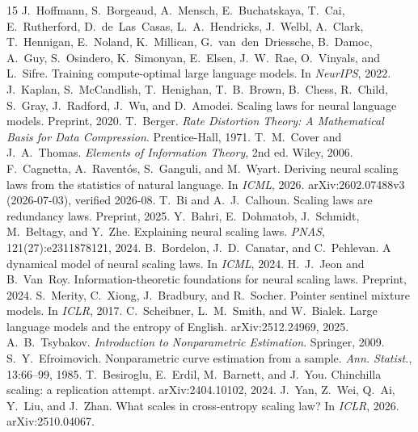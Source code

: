 \documentclass[12pt]{article}
\theoremstyle{remark}
\begin{document}


\begin{thebibliography}{15}
 J.~Hoffmann, S.~Borgeaud, A.~Mensch, E.~Buchatskaya, T.~Cai, E.~Rutherford,
D.~de~Las~Casas, L.~A.~Hendricks, J.~Welbl, A.~Clark, T.~Hennigan,
E.~Noland, K.~Millican, G.~van~den~Driessche, B.~Damoc, A.~Guy,
S.~Osindero, K.~Simonyan, E.~Elsen, J.~W.~Rae, O.~Vinyals, and
L.~Sifre.
Training compute-optimal large language models.
In \textit{NeurIPS}, 2022.
 J.~Kaplan, S.~McCandlish, T.~Henighan, T.~B.~Brown, B.~Chess,
R.~Child, S.~Gray, J.~Radford, J.~Wu, and D.~Amodei.
Scaling laws for neural language models.
Preprint, 2020.
 T.~Berger.
\textit{Rate Distortion Theory: A Mathematical Basis for Data Compression}.
Prentice-Hall, 1971.
 T.~M.~Cover and J.~A.~Thomas.
\textit{Elements of Information Theory}, 2nd ed.
Wiley, 2006.
 F.~Cagnetta, A.~Ravent\'os, S.~Ganguli, and M.~Wyart.
Deriving neural scaling laws from the statistics of natural language.
In \textit{ICML}, 2026. arXiv:2602.07488v3 (2026-07-03), verified 2026-08.
 T.~Bi and A.~J.~Calhoun.
Scaling laws are redundancy laws.
Preprint, 2025.
 Y.~Bahri, E.~Dohmatob, J.~Schmidt, M.~Beltagy, and Y.~Zhe.
Explaining neural scaling laws.
\textit{PNAS}, 121(27):e2311878121, 2024.
 B.~Bordelon, J.~D.~Canatar, and C.~Pehlevan.
A dynamical model of neural scaling laws.
In \textit{ICML}, 2024.
 H.~J.~Jeon and B.~Van~Roy.
Information-theoretic foundations for neural scaling laws.
Preprint, 2024.
 S.~Merity, C.~Xiong, J.~Bradbury, and R.~Socher.
Pointer sentinel mixture models.
In \textit{ICLR}, 2017.
 C.~Scheibner, L.~M.~Smith, and W.~Bialek.
Large language models and the entropy of English.
arXiv:2512.24969, 2025.
 A.~B.~Tsybakov.
\textit{Introduction to Nonparametric Estimation}.
Springer, 2009.
 S.~Y.~Efroimovich.
Nonparametric curve estimation from a sample.
\textit{Ann. Statist.}, 13:66--99, 1985.
 T.~Besiroglu, E.~Erdil, M.~Barnett, and J.~You.
Chinchilla scaling: a replication attempt.
arXiv:2404.10102, 2024.
 J.~Yan, Z.~Wei, Q.~Ai, Y.~Liu, and J.~Zhan.
What scales in cross-entropy scaling law?
In \textit{ICLR}, 2026. arXiv:2510.04067.
\end{thebibliography}
\end{document}
